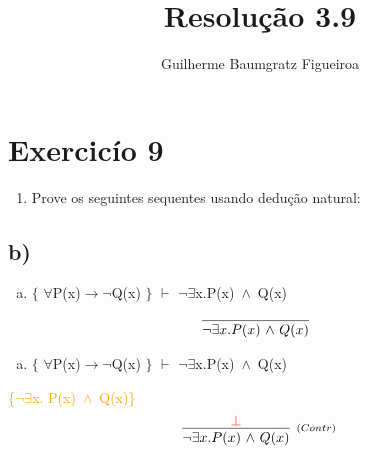 \documentclass[aspectratio=43]{beamer}
\title[\sc{Resolu\c c\~ao}]{Resolu\c c\~ao 3.9}
\author[Guilherme Baumgratz Figueiroa]{Guilherme Baumgratz Figueiroa}
\institute[UFOP]{Universidade Federal de Ouro Preto} %
\date{}
\newcommand{\ria}{$\rightarrow$}
\newcommand{\fall}{$\forall$}
\newcommand{\ex}{$\exists$}
\newcommand{\nao}{$\neg$}
\newcommand{\nex}{\nao\ex}
\newcommand{\andd}{$\wedge$}
\begin{document}
	
	\begin{frame}
		\titlepage
	\end{frame}
	
	\section{Exercic\'io 9}
	
	\begin{frame}%
    
    	\begin{enumerate}[1.]
			\item Prove os seguintes sequentes usando dedu\c c\~ao natural: \\
		\end{enumerate}
				
	\end{frame}
    \subsection{b)}
    
	\begin{frame}[fragile]
    	
    	\begin{enumerate}[b)]
			
			\item $\{$ \fall P(x)\ria \nao Q(x) $\}$ $\vdash$ \nex  x.P(x)\ \andd\ Q(x) \\ 
			
		\end{enumerate}
        \vspace{100pt}
        \[
        \begin{array}{c}
		
        	\infer[_{}]
            {$\nex$  x. P(x)\ $\andd$\ Q(x)}
            {}
        
		\end{array}
        \]
        
	\end{frame}
    
    \begin{frame}[fragile]
    	
    	\begin{enumerate}[b)]
			
			\item $\{$ \fall P(x)\ria \nao Q(x) $\}$ $\vdash$ \nex  x.P(x)\ \andd\ Q(x) \\ 
			
		\end{enumerate}
        \textcolor{orange}{\{\nex  x. P(x)\ \andd\ Q(x)\}}
        \vspace{95pt}
        \[
        \begin{array}{c}
		
        	\infer[_{(Contr)}]
            {$\nex$  x. P(x)\ $\andd$\ Q(x)}
            {\textcolor{red}{\bot}}
        
		\end{array}
        \]
        
	\end{frame}
    
\end{document}
